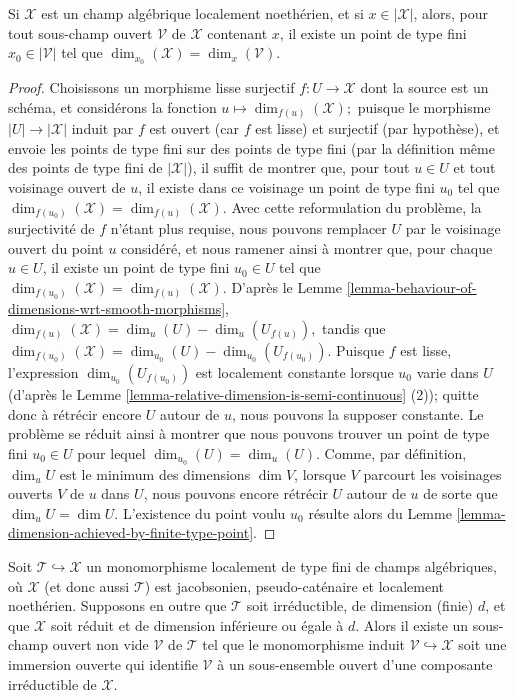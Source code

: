 \begin{lemma}
\label{lemma-dimension-at-finite-type-point}
Si $\mathcal{X}$ est un champ algébrique localement noethérien, et si
$x \in |\mathcal{X}|$, alors,
pour tout sous-champ ouvert $\mathcal{V}$ de $\mathcal{X}$ contenant $x$,
il existe un point de type fini $x_0 \in |\mathcal{V}|$ tel que
$\dim_{x_0}(\mathcal{X}) = \dim_x(\mathcal{V})$.
\end{lemma}

\begin{proof}
Choisissons un morphisme lisse surjectif
$f:U \to \mathcal{X}$ dont la source est un schéma, et considérons la
fonction $u \mapsto \dim_{f(u)}(\mathcal{X});$
puisque le morphisme $|U| \to |\mathcal{X}|$ induit par $f$ est ouvert (car $f$
est lisse) et surjectif (par hypothèse),
et envoie les points de type fini sur des points de type fini (par la définition même
des points de type fini de $|\mathcal{X}|$),
il suffit de montrer que, pour tout $u \in U$ et tout voisinage ouvert de $u$,
il existe dans ce voisinage un point de type fini $u_0$ tel que
$\dim_{f(u_0)}(\mathcal{X}) = \dim_{f(u)}(\mathcal{X}).$
Avec cette reformulation
du problème, la surjectivité de $f$ n'étant plus requise,
nous pouvons remplacer $U$ par le voisinage ouvert du point $u$ considéré,
et nous ramener ainsi à montrer que, pour chaque $u \in U$,
il existe un point de type fini $u_0 \in U$ tel que
$\dim_{f(u_0)}(\mathcal{X}) = \dim_{f(u)}(\mathcal{X}).$
D'après le Lemme \ref{lemma-behaviour-of-dimensions-wrt-smooth-morphisms},
$\dim_{f(u)}(\mathcal{X}) = \dim_u(U) - \dim_u(U_{f(u)}),$
tandis que
$\dim_{f(u_0)}(\mathcal{X}) = \dim_{u_0}(U) - \dim_{u_0}(U_{f(u_0)}).$
Puisque $f$ est lisse, l'expression $\dim_{u_0}(U_{f(u_0)})$ est localement
constante lorsque $u_0$ varie dans $U$ (d'après le
Lemme \ref{lemma-relative-dimension-is-semi-continuous} (2));
quitte donc à rétrécir encore $U$ autour de
$u$, nous pouvons la supposer constante. Le problème
se réduit ainsi à montrer que nous pouvons trouver un point de type fini $u_0 \in U$
pour lequel $\dim_{u_0}(U) = \dim_u(U)$.
Comme, par définition, $\dim_u U$ est le minimum des dimensions
$\dim V$, lorsque $V$ parcourt les voisinages ouverts $V$ de $u$
dans $U$, nous pouvons encore rétrécir $U$ autour de $u$ de sorte que
$\dim_u U = \dim U$.
L'existence du point voulu $u_0$ résulte alors du
Lemme \ref{lemma-dimension-achieved-by-finite-type-point}.
\end{proof}

\begin{lemma}
\label{lemma-monomorphing-a-component-in-of-the-right-dimension}
Soit $\mathcal{T} \hookrightarrow \mathcal{X}$ un monomorphisme localement
de type fini de champs algébriques,
où $\mathcal{X}$ (et donc aussi $\mathcal{T}$)
est jacobsonien, pseudo-caténaire et localement noethérien.
Supposons en outre que $\mathcal{T}$ soit irréductible,
de dimension (finie) $d$, et que $\mathcal{X}$ soit réduit
et de dimension inférieure
ou égale à $d$.
Alors il existe un sous-champ ouvert non vide $\mathcal{V}$ de $\mathcal{T}$ tel
que le monomorphisme
induit $\mathcal{V} \hookrightarrow \mathcal{X}$ soit une immersion ouverte
qui identifie
$\mathcal{V}$ à un sous-ensemble ouvert d'une composante irréductible de $\mathcal{X}$.
\end{lemma}

